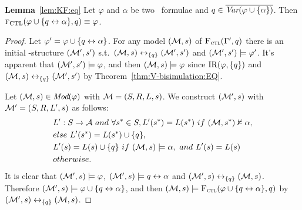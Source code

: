 \documentclass{article}
\begin{document}
  \textbf{Lemma}~\ref{lem:KF:eq} Let $\varphi$ and $\alpha$ be two \CTL\ formulae and $q\in
		\overline{\textit{Var}(\varphi\cup\{\alpha\})}$. Then
	${\textsc{f}_{\textrm{CTL}}}(\varphi \cup\{q\leftrightarrow\alpha\}, q)\equiv \varphi$.\\
    \begin{proof}
	Let $\varphi' =\varphi \cup\{q\leftrightarrow\alpha\}$. For any model $({\cal M},s)$ of ${\textsc{F}_{\textsc{ctl}}}(\Gamma', q)$ there is an initial \MPK-structure $({\cal M}',s')$ s.t.\ $({\cal M},s)\leftrightarrow_{\{q\}}({\cal M}',s')$ and $({\cal M}',s') \models \varphi'$. It's apparent that $({\cal M}',s') \models \varphi$, and then $({\cal M},s) \models \varphi$ since $\textrm{IR}(\varphi,\{q\})$ and $({\cal M},s)\leftrightarrow_{\{q\}}({\cal M}',s')$
	by Theorem~\ref{thm:V-bisimulation:EQ}.

	Let $({\cal M},s) \in \textit{Mod}(\varphi)$ with ${\cal M}=(S, R, L,s)$. We construct $({\cal M}', s)$ with ${\cal M}' = (S, R, L',s)$ as follows:
    \begin{align*}
       & L':S \rto \Ha\ and\ \forall s^*\in S, L'(s^*) = L(s^*)\ if\ (\Hm, s^*) \nvDash \alpha,\\
       & else\ L'(s^*) = L(s^*)\cup\{q\}, \\
       & L'(s) = L(s) \cup\{q\}\ if\ (\Hm, s) \models \alpha,\ and\ L'(s) = L(s)\\
       & otherwise.
    \end{align*}
	It is clear that $({\cal M}',s) \models \varphi$, $({\cal M}',s) \models q\leftrightarrow \alpha$ and
	$({\cal M}', s) \leftrightarrow_{\{q\}} ({\cal M}, s)$. Therefore $({\cal M}', s) \models \varphi \cup\{q\leftrightarrow \alpha\}$, and then $({\cal M}, s) \models {\textsc{F}_{\textsc{ctl}}} (\varphi \cup\{q\leftrightarrow\alpha\}, q)$ by
	$({\cal M}', s) \leftrightarrow_{\{q\}} ({\cal M}, s)$.
\end{proof}
\end{document}
